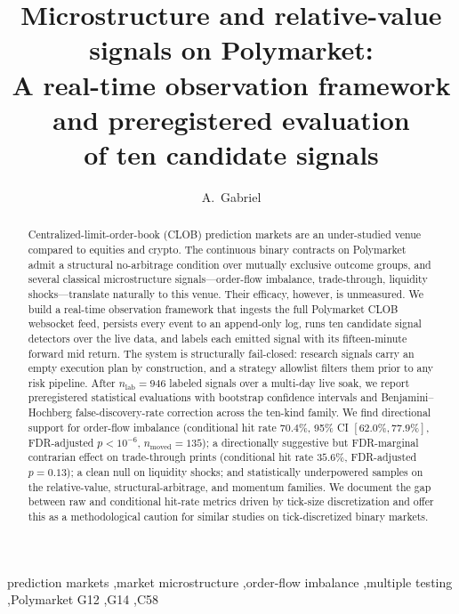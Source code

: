 \documentclass[review,12pt,authoryear]{elsarticle}
\begin{document}
\begin{frontmatter}

\title{Microstructure and relative-value signals on Polymarket:\\
A real-time observation framework and preregistered evaluation\\
of ten candidate signals}


\author[bsp]{A.~Gabriel}
\address[bsp]{Independent researcher, Manila, Philippines}

\begin{abstract}
Centralized-limit-order-book (CLOB) prediction markets are an under-studied
venue compared to equities and crypto. The continuous binary contracts on
Polymarket admit a structural no-arbitrage condition over mutually exclusive
outcome groups, and several classical microstructure signals---order-flow
imbalance, trade-through, liquidity shocks---translate naturally to this
venue. Their efficacy, however, is unmeasured. We build a real-time
observation framework that ingests the full Polymarket CLOB websocket feed,
persists every event to an append-only log, runs ten candidate signal
detectors over the live data, and labels each emitted signal with its
fifteen-minute forward mid return. The system is structurally fail-closed:
research signals carry an empty execution plan by construction, and a
strategy allowlist filters them prior to any risk pipeline. After
\(n_\text{lab}=946\) labeled signals over a multi-day live soak, we
report preregistered statistical evaluations with bootstrap confidence
intervals and Benjamini--Hochberg false-discovery-rate correction across
the ten-kind family. We find directional support for order-flow imbalance
(conditional hit rate \(70.4\%\), 95\% CI \([62.0\%, 77.9\%]\),
FDR-adjusted \(p < 10^{-6}\), \(n_\text{moved}=135\)); a directionally
suggestive but FDR-marginal contrarian effect on trade-through prints
(conditional hit rate \(35.6\%\), FDR-adjusted \(p = 0.13\)); a clean null
on liquidity shocks; and statistically underpowered samples on the
relative-value, structural-arbitrage, and momentum families. We document
the gap between raw and conditional hit-rate metrics driven by tick-size
discretization and offer this as a methodological caution for similar
studies on tick-discretized binary markets.
\end{abstract}

\begin{keyword}
prediction markets \sep market microstructure \sep order-flow imbalance
\sep multiple testing \sep Polymarket
\JEL G12 \sep G14 \sep C58
\end{keyword}

\end{frontmatter}
\end{document}
